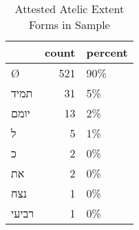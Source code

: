 \begin{table}[htbp!]
\centering
\caption{Attested Atelic Extent Forms in Sample}
\label{table:atel_front}
\begin{tabular}{lrl}
\toprule
{} &  count & percent \\
\midrule
\texthebrew{Ø}     &    521 &     90\% \\
\texthebrew{תמיד}  &     31 &      5\% \\
\texthebrew{יומם}  &     13 &      2\% \\
\texthebrew{ל}     &      5 &      1\% \\
\texthebrew{כ}     &      2 &      0\% \\
\texthebrew{את}    &      2 &      0\% \\
\texthebrew{נצח}   &      1 &      0\% \\
\texthebrew{רביעי} &      1 &      0\% \\
\bottomrule
\end{tabular}
\end{table}
